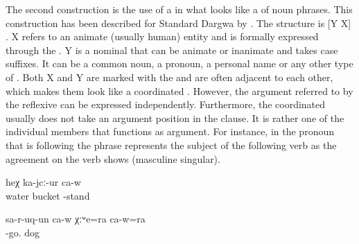 The second construction is the use of a  in what looks like a  of noun phrases. This construction has been described for Standard Dargwa by \citet{vandenBerg2004}. The structure is [Y X] . X refers to an animate (usually human) entity and is formally expressed through the . Y is a nominal that can be animate or inanimate and takes case suffixes. It can be a common noun, a pronoun, a personal name or any other type of . Both X and Y are marked with the   and are often adjacent to each other, which makes them look like a coordinated . However, the argument referred to by the reflexive can be expressed independently. Furthermore, the coordinated  usually does not take an argument position in the clause. It is rather one of the individual members that functions as argument. For instance, in  the pronoun  that is following the  phrase represents the subject of the following verb as the agreement on the verb shows (masculine singular).
%
\begin{exe}
	\ex	\label{ex:‎‎With a bucket of water he is standing}
	\gll	[hin-na	badra=ra	ca-w=ra]	heχ	ka-jcː-ur	ca-w\\
		water	bucket			-stand	\\
	\glt	{}

	\ex	\label{ex:He ran away with his dog}
	\gll	sa-r-uq-un	ca-w	χːʷe=ra	ca-w=ra\\
		-go.		dog	\\
	\glt	{}
\end{exe}

